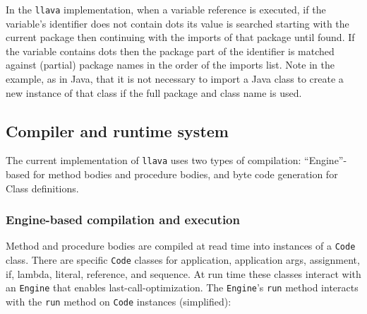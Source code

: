 \documentclass[final]{ieee}
\begin{document}
In the {\tt llava} implementation, when a variable reference is
executed, if the variable's identifier does not contain dots its value
is searched starting with the current package then continuing with the
imports of that package until found.  If the variable contains dots
then the package part of the identifier is matched against (partial)
package names in the order of the imports list.  Note in the example,
as in Java, that it is not necessary to import a Java class to create
a new instance of that class if the full package and class name is
used.


\subsection{Compiler and runtime system}

The current implementation of {\tt llava} uses two types of
compilation: ``Engine''-based for method bodies and procedure bodies,
and byte code generation for Class definitions.

\subsubsection{Engine-based compilation and execution}

Method and procedure bodies are compiled at read time into instances
of a {\tt Code} class.  There are specific {\tt Code} classes for
application, application args, assignment, if, lambda, literal,
reference, and sequence.  At run time these classes interact with an
{\tt Engine} that enables last-call-optimization.  The {\tt Engine}'s
{\tt run} method interacts with the {\tt run} method on {\tt Code}
instances (simplified):
\end{document}
